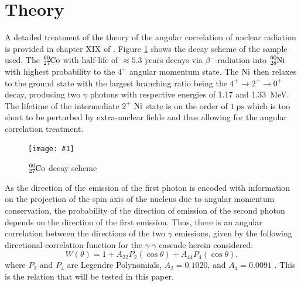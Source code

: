 \documentclass[twocolumn]{article}
\newcommand{\insertFigure}[1]{%
   \texttt{[image: \#1]}%
}
\begin{document}
\section{Theory}
A detailed treatment of the theory of the angular correlation of nuclear radiation is provided in chapter XIX of \cite{sieg}. Figure \ref{fig:cobalt_scheme} shows the decay scheme of the sample used. The $\ce{_27^{60}Co}$ with half-life of $\approx 5.3$ years decays via $\beta^-$-radiation into $\ce{_28^{60}Ni}$ with highest probability to the $4^+$ angular momentum state. The $\ce{Ni}$ then relaxes to the ground state with the largest branching ratio being the $4^+\rightarrow2^+\rightarrow 0^+$ decay, producing two $\gamma$ photons with respective energies of 1.17 and 1.33~MeV. The lifetime of the intermediate $2^+$ $\ce{Ni}$ state is on the order of $\SI{1}{\pico\second}$ which is too short to be perturbed by extra-nuclear fields and thus allowing for the angular correlation treatment.
\begin{figure}[!h]
\centering
\insertFigure{cobalt_scheme.png}
\caption{$\ce{_27^{60}Co}$ decay scheme \cite{cobalt_scheme}}
\label{fig:cobalt_scheme}
\end{figure}
As the direction of the emission of the first photon is encoded with information on the projection of the spin axis of the nucleus due to angular momentum conservation, the probability of the direction of emission of the second photon depends on the direction of the first emission. Thus, there is an angular correlation between the directions of the two $\gamma$ emissions, given by the following directional correlation function for the $\gamma$-$\gamma$ cascade herein considered:
\begin{equation}
W(\theta) = 1+A_{22}P_2(\cos{\theta})+A_{44}P_4(\cos{\theta}), \label{eq:corr}
\end{equation}
where $P_2$ and $P_4$ are Legendre Polynomials, $A_2 = 0.1020$, and $A_4 = 0.0091$ \cite{sieg}. This is the relation that will be tested in this paper.
\end{document}

